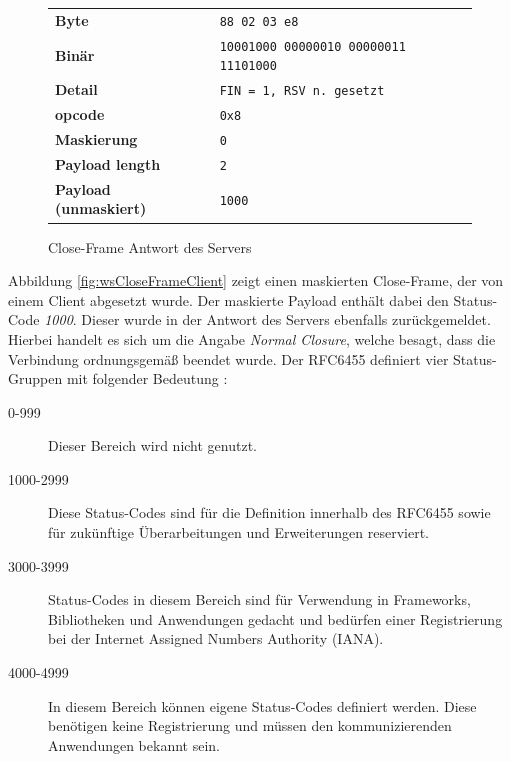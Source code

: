 \documentclass[11pt,a4paper,titlepage]{scrartcl}
\numberwithin{equation}{section}
\begin{document}
\begin{figure}[ht]
	\begin{center}
		\begin{tabular}{l>{\arraybackslash}p{8.0cm}}
			\textbf{Byte} & \texttt{88 02 03 e8} \\
			\textbf{Binär} & \texttt{10001000 00000010 00000011 11101000}\\
			\textbf{Detail} & \texttt{FIN = 1, RSV n. gesetzt} \\
			\textbf{opcode} & \texttt{0x8} \\ 
			\textbf{Maskierung} & \texttt{0}\\ 
			\textbf{Payload length} & \texttt{2}\\ 
			\textbf{Payload (unmaskiert)} & \texttt{1000} \\
		\end{tabular}
	\end{center}
	\caption{Close-Frame Antwort des Servers}
	\label{fig:wsCloseFrameServer}
\end{figure}

\noindent Abbildung \ref{fig:wsCloseFrameClient} zeigt einen maskierten Close-Frame, der von einem Client abgesetzt wurde. Der maskierte Payload enthält dabei den Status-Code \textit{1000}. Dieser wurde in der Antwort des Servers ebenfalls zurückgemeldet. Hierbei handelt es sich um die Angabe \textit{Normal Closure}, welche besagt, dass die Verbindung ordnungsgemäß beendet wurde. Der RFC6455 definiert vier Status-Gruppen mit folgender Bedeutung \autocite[46]{fette_websocket_2011}:
\begin{description}
	\item[0-999] Dieser Bereich wird nicht genutzt.
	\item[1000-2999] Diese Status-Codes sind für die Definition innerhalb des RFC6455 sowie für zukünftige Überarbeitungen und Erweiterungen reserviert.
	\item[3000-3999] Status-Codes in diesem Bereich sind für Verwendung in Frameworks, Bibliotheken und Anwendungen gedacht und bedürfen einer Registrierung bei der Internet Assigned Numbers Authority (IANA).
	\item[4000-4999] In diesem Bereich können eigene Status-Codes definiert werden. Diese benötigen keine Registrierung und müssen den kommunizierenden Anwendungen bekannt sein. 
\end{description}
\end{document}
